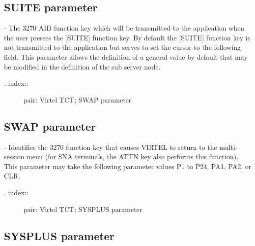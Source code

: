 \documentclass[letterpaper,10pt,english]{sphinxmanual}
\begin{document}
\subsection{SUITE parameter}
\label{\detokenize{Installation_Guide:suite-parameter}}
\begin{sphinxVerbatim}[commandchars=\\\{\}]
 
\end{sphinxVerbatim}

 - The 3270 AID function key which will be transmitted to the application when the user presses the {[}SUITE{]} function key. By default the {[}SUITE{]} function key is not transmitted to the application but serves to set the cursor to the following field. This parameter allows the definition of a general value by default that may be modified in the definition of the sub server node.
\begin{description}
\item[{. index::}] \leavevmode
pair: Virtel TCT; SWAP parameter

\end{description}


\subsection{SWAP parameter}
\label{\detokenize{Installation_Guide:swap-parameter}}
\begin{sphinxVerbatim}[commandchars=\\\{\}]
 
\end{sphinxVerbatim}

 - Identifies the 3270 function key that causes VIRTEL to return to the multi-session menu (for SNA terminals, the ATTN key also performs this function). This parameter may take the following parameter values P1 to P24, PA1, PA2, or CLR.
\begin{description}
\item[{. index::}] \leavevmode
pair: Virtel TCT; SYSPLUS parameter

\end{description}


\subsection{SYSPLUS parameter}
\label{\detokenize{Installation_Guide:sysplus-parameter}}
\begin{sphinxVerbatim}[commandchars=\\\{\}]
 
\end{sphinxVerbatim}
\end{document}
